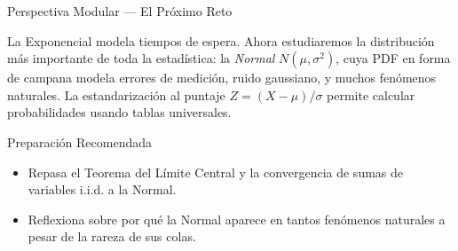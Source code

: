\documentclass[10pt, aspectratio=169]{beamer}
\begin{document}
\begin{frame}{Perspectiva Modular --- El Próximo Reto}
  \scriptsize
  \begin{retoclase}
    La Exponencial modela tiempos de espera. Ahora estudiaremos la distribución más importante de toda la estadística: la \emph{Normal} $N(\mu, \sigma^{2})$, cuya PDF en forma de campana modela errores de medición, ruido gaussiano, y muchos fenómenos naturales. La estandarización al puntaje $Z = (X - \mu)/\sigma$ permite calcular probabilidades usando tablas universales.
  \end{retoclase}

  \vspace{0.08cm}
  \pause
  \begin{alertblock}{Preparación Recomendada}
    \begin{itemize}\itemsep=0.06cm
      \item Repasa el Teorema del Límite Central y la convergencia de sumas de variables i.i.d. a la Normal.
      \item Reflexiona sobre por qué la Normal aparece en tantos fenómenos naturales a pesar de la rareza de sus colas.
    \end{itemize}
  \end{alertblock}
\end{frame}
\end{document}

